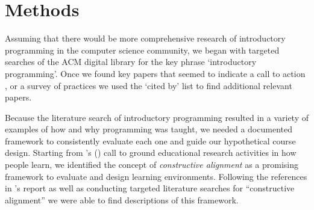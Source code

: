 \documentclass[12pt]{article}
\begin{document}



\section*{Methods}
Assuming that there would be more comprehensive research of
introductory programming in the computer science community, we began
with targeted searches of the ACM digital library for the key phrase
`introductory programming'. Once we found key papers that seemed to
indicate a call to action
\autocite{mccracken_multinational_2001,kolling_problem_1999},
or a survey of practices
\autocite{pears_survey_2007-1,robins_learning_2003} we used
the `cited by' list to find additional relevant papers.

Because the literature search of introductory programming resulted in
a variety of examples of how and why programming was taught, we needed a
documented framework to consistently evaluate each one and guide our
hypothetical course design. Starting from
\citeauthor{jamieson_creating_2009}'s
(\citeyear{jamieson_creating_2009}) call to ground educational
research activities in how people learn, we identified the concept of
\emph{constructive alignment} as a promising framework to evaluate and
design learning environments. Following the references in
\citeauthor{jamieson_creating_2009}'s report as well as conducting
targeted literature searches for ``constructive alignment'' we were
able to find descriptions of this
framework\autocite{jamieson_creating_2009,pellegrino_rethinking_2006,felder_designing_2003,biggs_enhancing_1996}.

\end{document}
